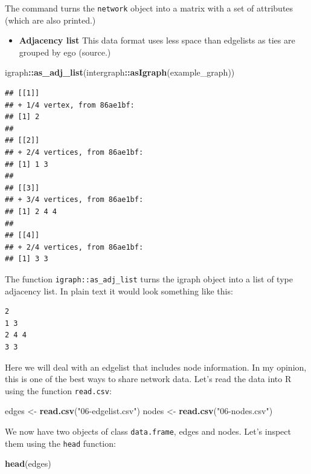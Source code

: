 \documentclass[]{book}
\newenvironment{Shaded}{\begin{snugshade}}{\end{snugshade}}
\newcommand{\KeywordTok}[1]{\textcolor[rgb]{0.13,0.29,0.53}{\textbf{#1}}}
\newcommand{\NormalTok}[1]{#1}
\newcommand{\OperatorTok}[1]{\textcolor[rgb]{0.81,0.36,0.00}{\textbf{#1}}}
\newcommand{\StringTok}[1]{\textcolor[rgb]{0.31,0.60,0.02}{#1}}
\providecommand{\tightlist}{%
  \setlength{\itemsep}{0pt}\setlength{\parskip}{0pt}}
\begin{document}
The command turns the \texttt{network} object into a matrix with a set of attributes
(which are also printed.)

\begin{itemize}
\tightlist
\item
  \textbf{Adjacency list} This data format uses less space than edgelists as ties are
  grouped by ego (source.)
\end{itemize}

\begin{Shaded}
\begin{Highlighting}[]
\NormalTok{igraph}\OperatorTok{::}\KeywordTok{as_adj_list}\NormalTok{(intergraph}\OperatorTok{::}\KeywordTok{asIgraph}\NormalTok{(example_graph)) }
\end{Highlighting}
\end{Shaded}

\begin{verbatim}
## [[1]]
## + 1/4 vertex, from 86ae1bf:
## [1] 2
## 
## [[2]]
## + 2/4 vertices, from 86ae1bf:
## [1] 1 3
## 
## [[3]]
## + 3/4 vertices, from 86ae1bf:
## [1] 2 4 4
## 
## [[4]]
## + 2/4 vertices, from 86ae1bf:
## [1] 3 3
\end{verbatim}

The function \texttt{igraph::as\_adj\_list} turns the igraph object into a list of
type adjacency list. In plain text it would look something like this:

\begin{verbatim}
2 
1 3 
2 4 4 
3 3 
\end{verbatim}

Here we will deal with an edgelist that includes node information.
In my opinion, this is one of the best ways to share network data. Let's read
the data into R using the function \texttt{read.csv}:

\begin{Shaded}
\begin{Highlighting}[]
\NormalTok{edges <-}\StringTok{ }\KeywordTok{read.csv}\NormalTok{(}\StringTok{"06-edgelist.csv"}\NormalTok{)}
\NormalTok{nodes <-}\StringTok{ }\KeywordTok{read.csv}\NormalTok{(}\StringTok{"06-nodes.csv"}\NormalTok{)}
\end{Highlighting}
\end{Shaded}

We now have two objects of class \texttt{data.frame}, edges and nodes. Let's inspect
them using the \texttt{head} function:

\begin{Shaded}
\begin{Highlighting}[]
\KeywordTok{head}\NormalTok{(edges)}
\end{Highlighting}
\end{Shaded}
\end{document}
